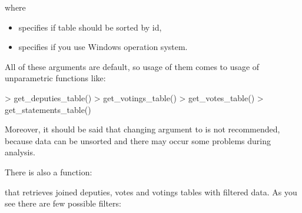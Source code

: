 where

\begin{itemize}
\item {} specifies if table should be sorted by id,
\item {} specifies if you use Windows operation system.
\end{itemize}

All of these arguments are default, so usage of them comes to usage of unparametric functions like:

\begin{example}
> get_deputies_table()
> get_votings_table()
> get_votes_table()
> get_statements_table()
\end{example}

Moreover, it should be said that changing  argument to  is not recommended, because data can be unsorted and there may occur some problems during analysis.

There is also a function:


that retrieves joined deputies, votes and votings tables
with filtered data. As you see there are few possible filters:

